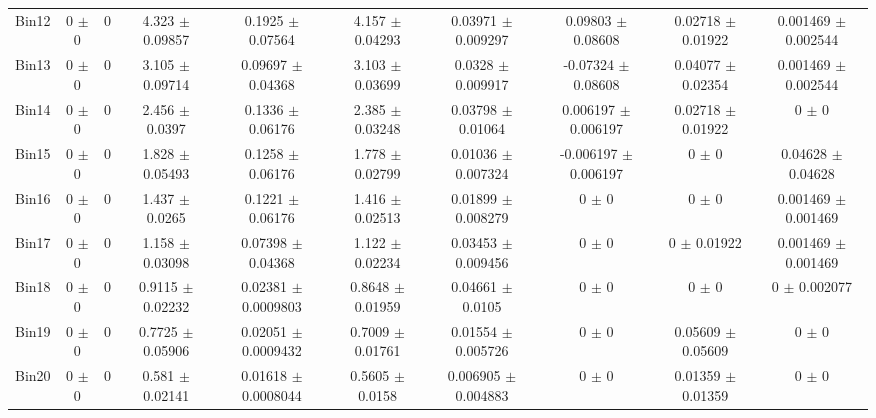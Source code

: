 \begin{tabular}{@{\extracolsep{4pt}}lccccccccc@{}}
     Bin12 & 0 $\pm$ 0 & 0 & 4.323 $\pm$ 0.09857 & 0.1925 $\pm$ 0.07564 & 4.157 $\pm$ 0.04293 & 0.03971 $\pm$ 0.009297 & 0.09803 $\pm$ 0.08608 & 0.02718 $\pm$ 0.01922 & 0.001469 $\pm$ 0.002544 \\ 
     Bin13 & 0 $\pm$ 0 & 0 & 3.105 $\pm$ 0.09714 & 0.09697 $\pm$ 0.04368 & 3.103 $\pm$ 0.03699 & 0.0328 $\pm$ 0.009917 & -0.07324 $\pm$ 0.08608 & 0.04077 $\pm$ 0.02354 & 0.001469 $\pm$ 0.002544 \\ 
     Bin14 & 0 $\pm$ 0 & 0 & 2.456 $\pm$ 0.0397 & 0.1336 $\pm$ 0.06176 & 2.385 $\pm$ 0.03248 & 0.03798 $\pm$ 0.01064 & 0.006197 $\pm$ 0.006197 & 0.02718 $\pm$ 0.01922 & 0 $\pm$ 0 \\ 
     Bin15 & 0 $\pm$ 0 & 0 & 1.828 $\pm$ 0.05493 & 0.1258 $\pm$ 0.06176 & 1.778 $\pm$ 0.02799 & 0.01036 $\pm$ 0.007324 & -0.006197 $\pm$ 0.006197 & 0 $\pm$ 0 & 0.04628 $\pm$ 0.04628 \\ 
     Bin16 & 0 $\pm$ 0 & 0 & 1.437 $\pm$ 0.0265 & 0.1221 $\pm$ 0.06176 & 1.416 $\pm$ 0.02513 & 0.01899 $\pm$ 0.008279 & 0 $\pm$ 0 & 0 $\pm$ 0 & 0.001469 $\pm$ 0.001469 \\ 
     Bin17 & 0 $\pm$ 0 & 0 & 1.158 $\pm$ 0.03098 & 0.07398 $\pm$ 0.04368 & 1.122 $\pm$ 0.02234 & 0.03453 $\pm$ 0.009456 & 0 $\pm$ 0 & 0 $\pm$ 0.01922 & 0.001469 $\pm$ 0.001469 \\ 
     Bin18 & 0 $\pm$ 0 & 0 & 0.9115 $\pm$ 0.02232 & 0.02381 $\pm$ 0.0009803 & 0.8648 $\pm$ 0.01959 & 0.04661 $\pm$ 0.0105 & 0 $\pm$ 0 & 0 $\pm$ 0 & 0 $\pm$ 0.002077 \\ 
     Bin19 & 0 $\pm$ 0 & 0 & 0.7725 $\pm$ 0.05906 & 0.02051 $\pm$ 0.0009432 & 0.7009 $\pm$ 0.01761 & 0.01554 $\pm$ 0.005726 & 0 $\pm$ 0 & 0.05609 $\pm$ 0.05609 & 0 $\pm$ 0 \\ 
     Bin20 & 0 $\pm$ 0 & 0 & 0.581 $\pm$ 0.02141 & 0.01618 $\pm$ 0.0008044 & 0.5605 $\pm$ 0.0158 & 0.006905 $\pm$ 0.004883 & 0 $\pm$ 0 & 0.01359 $\pm$ 0.01359 & 0 $\pm$ 0 \\ 
\hline\hline
  \end{tabular}
